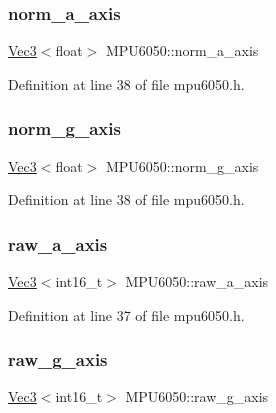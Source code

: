 \subsubsection{\texorpdfstring{norm\_a\_axis}{norm\_a\_axis}}
{\footnotesize\ttfamily \mbox{\hyperlink{class_vec3}{Vec3}}$<$float$>$ M\+P\+U6050\+::norm\+\_\+a\+\_\+axis}



Definition at line 38 of file mpu6050.\+h.

\mbox{\label{struct_m_p_u6050_a408969ff3349bf750d25a043019ab813}} 
\subsubsection{\texorpdfstring{norm\_g\_axis}{norm\_g\_axis}}
{\footnotesize\ttfamily \mbox{\hyperlink{class_vec3}{Vec3}}$<$float$>$ M\+P\+U6050\+::norm\+\_\+g\+\_\+axis}



Definition at line 38 of file mpu6050.\+h.

\mbox{\label{struct_m_p_u6050_a3fdc57285035d07790bfdd6ba22e7c1a}} 
\subsubsection{\texorpdfstring{raw\_a\_axis}{raw\_a\_axis}}
{\footnotesize\ttfamily \mbox{\hyperlink{class_vec3}{Vec3}}$<$int16\+\_\+t$>$ M\+P\+U6050\+::raw\+\_\+a\+\_\+axis}



Definition at line 37 of file mpu6050.\+h.

\mbox{\label{struct_m_p_u6050_a94360a757c361c37d0af803beccaf7a0}} 
\subsubsection{\texorpdfstring{raw\_g\_axis}{raw\_g\_axis}}
{\footnotesize\ttfamily \mbox{\hyperlink{class_vec3}{Vec3}}$<$int16\+\_\+t$>$ M\+P\+U6050\+::raw\+\_\+g\+\_\+axis}



